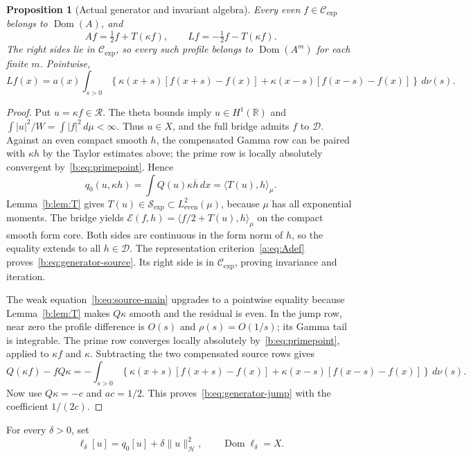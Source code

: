 \documentclass[11pt,a4paper]{article}
\numberwithin{equation}{section}
\newtheorem{proposition}[theorem]{Proposition}
\theoremstyle{definition}\newtheorem{definition}[theorem]{Definition}
\theoremstyle{remark}\newtheorem{remark}[theorem]{Remark}
\newcommand{\R}{\mathbb R}\newcommand{\C}{\mathbb C}\newcommand{\N}{\mathbb N}
\newcommand{\E}{\mathcal E}\newcommand{\D}{\mathcal D}
\newcommand{\He}{L^2_{\mathrm{even}}(\mu)}\newcommand{\Le}{L^2_{\mathrm{even}}(dx)}
\newcommand{\Hh}{\mathcal H}\newcommand{\Hw}{\mathcal H}
\newcommand{\dom}{\operatorname{Dom}}\newcommand{\Var}{\operatorname{Var}}
\newcommand{\ip}[2]{\langle#1,#2\rangle}\newcommand{\norm}[1]{\lVert#1\rVert}\newcommand{\abs}[1]{\lvert#1\rvert}
\newcommand{\RR}{\mathscr R}\newcommand{\SSS}{\mathcal S_{\!\exp}}\newcommand{\CE}{\mathcal C_{\exp}}
\begin{document}
\begin{proposition}[Actual generator and invariant algebra]\label{b:prop:generator}
Every even $f\in\CE$ belongs to $\dom(A)$, and
\begin{equation}\label{b:eq:generator-source}
 Af=\tfrac12f+T(\kappa f),\qquad
 Lf=-\tfrac12f-T(\kappa f).
\end{equation}
The right sides lie in $\CE$, so every such profile belongs to $\dom(A^m)$ for each finite $m$. Pointwise,
\begin{equation}\label{b:eq:generator-jump}
 Lf(x)=a(x)\int_{s>0}\!
 \left\{\kappa(x+s)[f(x+s)-f(x)]
       +\kappa(x-s)[f(x-s)-f(x)]\right\}\,d\nu(s).
\end{equation}
\end{proposition}
\begin{proof}
Put $u=\kappa f\in\RR$. The theta bounds imply $u\in H^1(\R)$ and
$\int |u|^2/W=\int |f|^2\,d\mu<\infty$. Thus $u\in X$, and the full bridge admits $f$ to $\D$. Against an even compact smooth $h$, the compensated Gamma row can be paired with $\kappa h$ by the Taylor estimates above; the prime row is locally absolutely convergent by~\eqref{b:eq:primepoint}. Hence
\[
 q_0(u,\kappa h)=\int Q(u)\kappa\overline h\,dx
                =\ip{T(u)}h_\mu.
\]
Lemma~\ref{b:lem:T} gives $T(u)\in\SSS\subset\He$, because $\mu$ has all exponential moments. The bridge yields
$\E(f,h)=\ip{f/2+T(u)}h_\mu$ on the compact smooth form core. Both sides are continuous in the form norm of $h$, so the equality extends to all $h\in\D$. The representation criterion~\eqref{a:eq:Adef} proves~\eqref{b:eq:generator-source}. Its right side is in $\CE$, proving invariance and iteration.

The weak equation~\eqref{b:eq:source-main} upgrades to a pointwise equality because Lemma~\ref{b:lem:T} makes $Q\kappa$ smooth and the residual is even. In the jump row, near zero the profile difference is $O(s)$ and $\rho(s)=O(1/s)$; its Gamma tail is integrable. The prime row converges locally absolutely by~\eqref{b:eq:primepoint}, applied to $\kappa f$ and $\kappa$. Subtracting the two compensated source rows gives
\[
 Q(\kappa f)-fQ\kappa
  =-\int_{s>0}\!\left\{\kappa(x+s)[f(x+s)-f(x)]
             +\kappa(x-s)[f(x-s)-f(x)]\right\}\,d\nu(s).
\]
Now use $Q\kappa=-c$ and $ac=1/2$. This proves~\eqref{b:eq:generator-jump} with the coefficient $1/(2c)$.
\end{proof}


For every $\delta>0$, set
\begin{equation}\label{eq:ell-unified}
 \ell_\delta[u]=q_0[u]+\delta\norm u_{\Hh}^2,\qquad \dom\ell_\delta=X.
\end{equation}
\end{document}
